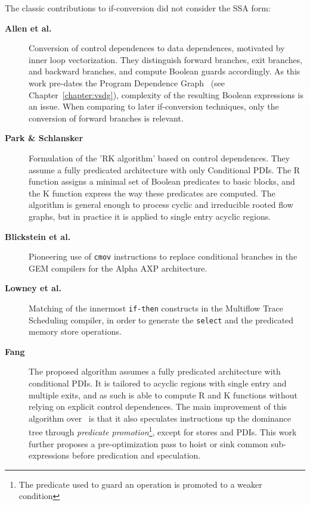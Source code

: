 \medskip
The classic contributions to if-conversion
did not consider the SSA form: \begin{description}

\item[\textbf{Allen et al.~\cite{Allen:1983:POPL}}] Conversion of control
dependences to data dependences, motivated by inner loop vectorization. They
distinguish forward branches, exit branches, and backward branches, and compute
Boolean guards accordingly. As this work pre-dates the Program Dependence Graph~\cite{Ferrante:1987:TOPLAS} (see Chapter~\ref{chapter:vsdg}), complexity of the resulting Boolean expressions is
an issue. When comparing to later if-conversion techniques, only the conversion
of forward branches is relevant.

\item[\textbf{Park \& Schlansker~\cite{Park:1991:TR58}}] Formulation of the 'RK
algorithm' based on control dependences. They assume a fully predicated
architecture with only Conditional PDIs. The R function assigns a minimal set of
Boolean predicates to basic blocks, and the K function express the way these
predicates are computed.  The algorithm is general enough to process cyclic and
irreducible rooted flow graphs, but in practice it is applied to single entry
acyclic regions.

\item[\textbf{Blickstein et al.~\cite{Blickstein:1992:DTJ}}] Pioneering use of \texttt{cmov}
instructions to replace conditional branches in the GEM compilers for the Alpha
AXP architecture.

\item[\textbf{Lowney et al.~\cite{Lowney:1993:JS}}] Matching of the innermost \texttt{if-then}
constructs in the Multiflow Trace Scheduling compiler, in order to generate the
\texttt{select} and the predicated memory store operations.

\item[\textbf{Fang~\cite{Fang:1996:LCPC}}] The proposed algorithm assumes a
fully predicated architecture with conditional PDIs. It is tailored to acyclic
regions with single entry and multiple exits, and as such is able to compute R
and K functions without relying on explicit control dependences.  The main
improvement of this algorithm over~\cite{Park:1991:TR58} is that it also
speculates instructions up the dominance tree through \emph{predicate
promotion}\footnote{The predicate used to guard an operation is promoted to a
weaker condition},
except for stores and PDIs. This work further proposes a pre-optimization pass
to hoist or sink common sub-expressions before predication and speculation.


\end{description}
